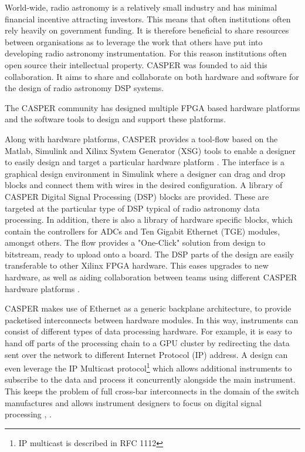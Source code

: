 \documentclass{ws-jai}
\begin{document}
World-wide, radio astronomy is a relatively small industry and has minimal financial incentive attracting investors. This means that often institutions often rely heavily on government funding. It is therefore beneficial to share resources between organisations as to leverage the work that others have put into developing radio astronomy instrumentation. For this reason institutions often open source their intellectual property. CASPER was founded to aid this collaboration. It aims to share and collaborate on both hardware and software for the design of radio astronomy DSP systems.

The CASPER community has designed multiple FPGA based hardware platforms and the software tools to design and support these platforms.

Along with hardware platforms, CASPER provides a tool-flow based on the Matlab, Simulink and Xilinx System Generator (XSG) tools to enable a designer to easily design and target a particular hardware platform \cite{pars05}. The interface is a graphical design environment in Simulink where a designer can drag and drop blocks and connect them with wires in the desired configuration. A library of CASPER Digital Signal Processing (DSP) blocks are provided. These are targeted at the particular type of DSP typical of radio astronomy data processing. In addition, there is also a library of hardware specific blocks, which contain the controllers for ADCs and Ten Gigabit Ethernet (TGE) modules, amongst others. The flow provides a "One-Click" solution from design to bitstream, ready to upload onto a board. The DSP parts of the design are easily transferable to other Xilinx FPGA hardware. This eases upgrades to new hardware, as well as aiding collaboration between teams using different CASPER hardware platforms \cite{pars05}. 

CASPER makes use of Ethernet as a generic backplane architecture, to provide packetised interconnects between hardware modules. In this way, instruments can consist of different types of data processing hardware. For example, it is easy to hand off parts of the processing chain to a GPU cluster by redirecting the data sent over the network to different Internet Protocol (IP) address. A design can even leverage the IP Multicast protocol\footnote{IP multicast is described in RFC 1112} which allows additional instruments to subscribe to the data and process it concurrently alongside the main instrument. This keeps the problem of full cross-bar interconnects in the domain of the switch manufactures and allows instrument designers to focus on digital signal processing \cite{man14}, \cite{pars05}.
\end{document}
